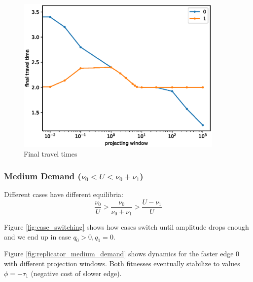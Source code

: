 \documentclass[12pt]{article}
\begin{document}
\begin{figure}
	\includegraphics[width=0.9\textwidth]{img/final_tt_proj.eps}
	\caption{ Final travel times }
	\label{fig:final_tt_proj}

\end{figure}

%

\newpage
\subsubsection*{Medium Demand ($ \nu_0 < U < \nu_0 + \nu_1$)}

Different cases have different equilibria:
$$ \frac{\nu_0}{U} > \frac{\nu_0}{\nu_0 + \nu_1} > \frac{U - \nu_1}{U}$$

Figure \ref{fig:case_switching} shows how cases switch until amplitude drops enough and we end up in case $q_0 > 0, q_1 = 0$.

Figure \ref{fig:replicator_medium_demand} shows dynamics for the faster edge 0 with different projection windows. 
Both fitnesses eventually stabilize to values $\phi = -\tau_1$ (negative cost of slower edge).
\end{document}
